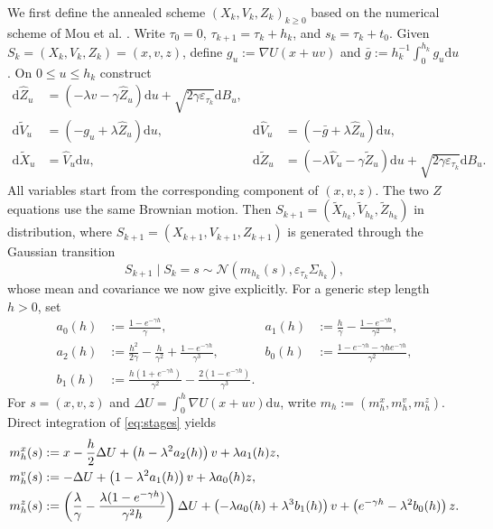 \documentclass[11pt]{article}
\theoremstyle{definition}
\newcommand{\dd}{\mathrm d}
\newcommand{\eps}{\varepsilon}
\begin{document}
We first define the annealed scheme $(X_{k},V_{k},Z_{k})_{k\geq 0}$ 
based on the numerical scheme of Mou et al. \cite{MouEtAl2021}. 
Write $\tau_0=0$,
$\tau_{k+1}=\tau_k+h_k$, and $s_k=\tau_k+t_0$.
Given $S_k=(X_{k},V_{k},Z_{k})=(x,v,z)$, define $g_u:=\nabla U(x+uv)$ and
$\bar g:=h_k^{-1}\int_0^{h_k}g_u\dd u$. On $0\leq u\leq h_k$ construct
\begin{equation}\label{eq:stages}
\begin{aligned}
 \dd\widehat Z_u&=\left(-\lambda v-\gamma\widehat Z_u\right)\dd u
                         +\sqrt{2\gamma\eps_{\tau_k}}\dd B_u,\\
 \dd\widetilde V_u&=\left(-g_u+\lambda\widehat Z_u\right)\dd u,
 &\dd\widehat V_u&=\left(-\bar g+\lambda\widehat Z_u\right)\dd u,\\
 \dd\widetilde X_u&=\widehat V_u\dd u,
 &\dd\widetilde Z_u&=\left(-\lambda\widehat V_u-\gamma\widetilde Z_u\right)\dd u
                         +\sqrt{2\gamma\eps_{\tau_k}}\dd B_u.
\end{aligned}
\end{equation}
All variables start from the corresponding component of $(x,v,z)$. The two
$Z$ equations use the same Brownian motion. Then
$S_{k+1}=\left(\widetilde X_{h_k},\widetilde V_{h_k},\widetilde Z_{h_k}\right)$ in distribution, 
where $S_{k+1}=\left(X_{k+1},V_{k+1},Z_{k+1}\right)$ is 
generated through the Gaussian transition
\begin{equation}\label{eq:moustep}
 S_{k+1}\mid S_k=s\sim
 \mathcal N\left(m_{h_k}(s),\eps_{\tau_k}\Sigma_{h_k}\right),
\end{equation}
whose mean and covariance we now give explicitly. For a generic step length
$h>0$, set
\begin{align*}
 a_0(h)&:=\frac{1-e^{-\gamma h}}{\gamma},&
 a_1(h)&:=\frac{h}{\gamma}
          -\frac{1-e^{-\gamma h}}{\gamma^2},\\
 a_2(h)&:=\frac{h^2}{2\gamma}-\frac{h}{\gamma^2}
          +\frac{1-e^{-\gamma h}}{\gamma^3},&
 b_0(h)&:=\frac{1-e^{-\gamma h}-\gamma h e^{-\gamma h}}{\gamma^2},\\
 b_1(h)&:=\frac{h(1+e^{-\gamma h})}{\gamma^2}
          -\frac{2(1-e^{-\gamma h})}{\gamma^3}.
\end{align*}
For $s=(x,v,z)$ and
$\Delta U=\int_0^h\nabla U(x+uv)\dd u$, write
$m_h:=\left(m_h^x,m_h^v,m_h^z\right)$. Direct integration of
\eqref{eq:stages} yields
\begin{align}\label{eq:explicitmean}
 m_h^x(s)
 &:=x-\frac h2\Delta U+\left(h-\lambda^2a_2(h)\right)v
      +\lambda a_1(h)z,\notag\\
 m_h^v(s)
 &:=-\Delta U+\left(1-\lambda^2a_1(h)\right)v
      +\lambda a_0(h)z,\notag\\
 m_h^z(s)
 &:=\left(\frac{\lambda}{\gamma}
   -\frac{\lambda(1-e^{-\gamma h})}{\gamma^2h}\right)\Delta U
   +\left(-\lambda a_0(h)+\lambda^3b_1(h)\right)v
      +\left(e^{-\gamma h}-\lambda^2b_0(h)\right)z.
\end{align}
\end{document}
